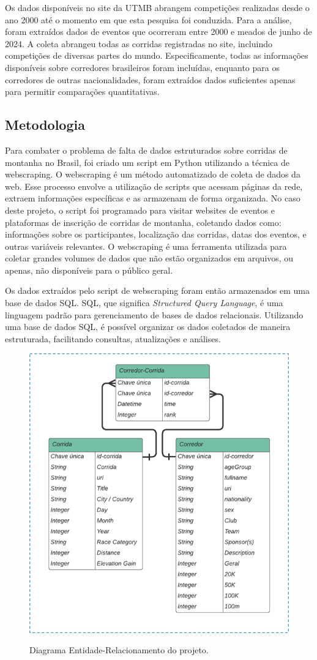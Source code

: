 Os dados disponíveis no site da UTMB abrangem
competições realizadas desde o ano 2000 até o
momento em que esta pesquisa foi conduzida. Para
a análise, foram extraídos dados de eventos que
ocorreram entre 2000 e meados de junho de 2024.
A coleta abrangeu todas as corridas registradas
no site, incluindo competições de diversas
partes do mundo. Especificamente, todas as
informações disponíveis sobre corredores
brasileiros foram incluídas, enquanto para os
corredores de outras nacionalidades, foram extraídos dados suficientes apenas para permitir comparações quantitativas.

\subsection{Metodologia}

Para combater o problema de falta de dados estruturados sobre corridas de montanha no Brasil, foi criado um script em Python utilizando a técnica de webscraping. O webscraping é um método automatizado de coleta de dados da web. Esse processo envolve a utilização de scripts que acessam páginas da rede, extraem informações específicas e as armazenam de forma organizada. No caso deste projeto, o script foi programado para visitar websites de eventos e plataformas de inscrição de corridas de montanha, coletando dados como: informações sobre os participantes, localização das corridas, datas dos eventos, e outras variáveis relevantes. O webscraping é uma ferramenta utilizada para coletar grandes volumes de dados que não estão organizados em arquivos, ou apenas, não disponíveis para o público geral.

Os dados extraídos pelo script de webscraping foram então armazenados em uma base de dados SQL. SQL, que significa \textit{Structured Query Language}, é uma linguagem padrão para gerenciamento de bases de dados relacionais. Utilizando uma base de dados SQL, é possível organizar os dados coletados de maneira estruturada, facilitando consultas, atualizações e análises.

\begin{figure}
    \centering
    \caption{Diagrama Entidade-Relacionamento do projeto.}
    \includegraphics[width = 0.5\linewidth]{relatorios/paraty/figuras/ER_Data_Paraty.png}
    \label{fig:ER_Data_Paraty}
\end{figure}

